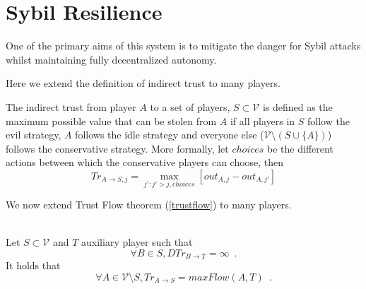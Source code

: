 \documentclass[11pt]{llncs}
\theoremstyle{definition}
\begin{document}
  \section{Sybil Resilience}
     One of the primary aims of this system is to mitigate the danger for Sybil attacks \cite{sybilattack} whilst maintaining
     fully decentralized autonomy.

     Here we extend the definition of indirect trust to many players.
     \begin{definition}
        The indirect trust from player $A$ to a set of players, $S \subset \mathcal{V}$ is defined as the maximum possible
        value that can be stolen from $A$ if all players in $S$ follow the evil strategy, $A$ follows the idle strategy and
        everyone else ($\mathcal{V} \setminus \left(S \cup \{A\}\right)$) follows the conservative strategy.
        More formally, let $choices$ be the different actions between which the conservative players can choose, then
        \begin{equation}
           Tr_{A \rightarrow S, j} = \max\limits_{j' : j' > j, choices}{\left[out_{A,j} - out_{A,j'}\right]}
        \end{equation}
     \end{definition}
     We now extend Trust Flow theorem (\ref{trustflow}) to many players.
     \begin{theorem} \ \\
        \label{trustmany}
        Let $S \subset \mathcal{V}$ and $T$ auxiliary player such that
        \begin{equation*}
           \forall B \in S, DTr_{B \rightarrow T} = \infty \enspace.
        \end{equation*}
        It holds that
        \begin{equation*}
           \forall A \in \mathcal{V} \setminus S, Tr_{A \rightarrow S} = maxFlow\left(A, T\right) \enspace.
        \end{equation*}
     \end{theorem}       
\end{document}
